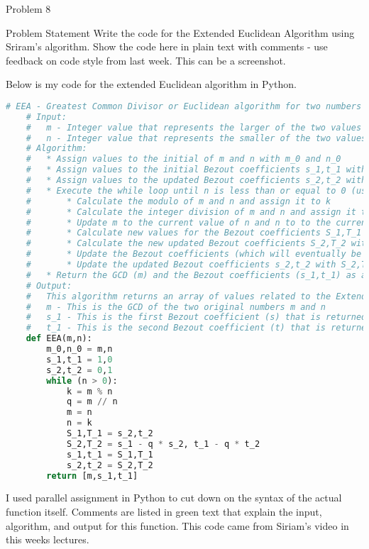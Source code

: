\begin{problem}{Problem 8}
    \begin{statement}{Problem Statement}
        Write the code for the Extended Euclidean Algorithm using Sriram’s algorithm. Show the code here in plain text with comments - use feedback on code style from last week. This can be a screenshot.
    \end{statement}

    \begin{highlight}[Solution]
        Below is my code for the extended Euclidean algorithm in Python.
    \begin{lstlisting}[style=stackoverflow, language=python]
    # EEA - Greatest Common Divisor or Euclidean algorithm for two numbers m and n
    # Input:
    #   m - Integer value that represents the larger of the two values in the EEA calculation
    #   n - Integer value that represents the smaller of the two values in the EEA calculation
    # Algorithm:
    #   * Assign values to the initial of m and n with m_0 and n_0
    #   * Assign values to the initial Bezout coefficients s_1,t_1 with 1 and 0
    #   * Assign values to the updated Bezout coefficients s_2,t_2 with 0 and 1
    #   * Execute the while loop until n is less than or equal to 0 (usually equal to 0)
    #       * Calculate the modulo of m and n and assign it to k
    #       * Calculate the integer division of m and n and assign it to q
    #       * Update m to the current value of n and n to to the current value of k
    #       * Calculate new values for the Bezout coefficients S_1,T_1 with s_2,t_2
    #       * Calculate the new updated Bezout coefficients S_2,T_2 with s_1 - q * s_2, t_1 - q * t_2
    #       * Update the Bezout coefficients (which will eventually be returned) s_1,t_1 with S_1,T_1
    #       * Update the updated Bezout coefficients s_2,t_2 with S_2,T_2
    #   * Return the GCD (m) and the Bezout coefficients (s_1,t_1) as an array after the loop
    # Output:
    #   This algorithm returns an array of values related to the Extended Euclidean Algorithm
    #   m - This is the GCD of the two original numbers m and n
    #   s_1 - This is the first Bezout coefficient (s) that is returned
    #   t_1 - This is the second Bezout coefficient (t) that is returned
    def EEA(m,n):
        m_0,n_0 = m,n
        s_1,t_1 = 1,0
        s_2,t_2 = 0,1
        while (n > 0):
            k = m % n
            q = m // n
            m = n
            n = k
            S_1,T_1 = s_2,t_2
            S_2,T_2 = s_1 - q * s_2, t_1 - q * t_2
            s_1,t_1 = S_1,T_1
            s_2,t_2 = S_2,T_2
        return [m,s_1,t_1]
    \end{lstlisting}
    I used parallel assignment in Python to cut down on the syntax of the actual function itself. Comments are listed in green text that explain the input, algorithm, and output for this function.
    This code came from Siriam's video in this weeks lectures.
    \end{highlight}
\end{problem}

